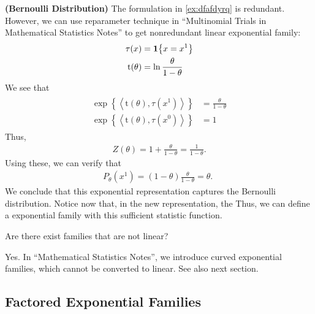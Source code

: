 \documentclass{article}
\newcommand{\bfs}[1]{\textbf{({#1}) }}
\begin{document}
\begin{exma}\bfs{Bernoulli Distribution}
The formulation in \cref{ex:dfafdyrq} is redundant. However, we can use reparameter technique in ``{Multinomial Trials in Mathematical Statistics Notes}'' to get nonredundant linear  exponential family:
\begin{align*}
\begin{aligned}
\tau(x) &=\indicate{x=x^{1}} \\
\mathrm{t}(\theta) &=\ln \frac{\theta}{1-\theta}
\end{aligned}
\end{align*}
We see that
\begin{align*}
\begin{aligned}
\exp \left\{\left\langle\mathrm{t}(\theta), \tau\left(x^{1}\right)\right\rangle\right\} &=\frac{\theta}{1-\theta} \\
\exp \left\{\left\langle\mathrm{t}(\theta), \tau\left(x^{0}\right)\right\rangle\right\} &=1
\end{aligned}
\end{align*}
Thus,
\begin{align*}
Z(\theta)=1+\frac{\theta}{1-\theta}=\frac{1}{1-\theta} .
\end{align*}
Using these, we can verify that
\begin{align*}
P_{\theta}\left(x^{1}\right)=(1-\theta) \frac{\theta}{1-\theta}=\theta \text {. }
\end{align*}
We conclude that this exponential representation captures the Bernoulli distribution. Notice now that, in the new representation, the  Thus, we can define a  exponential family with this sufficient statistic function.
\end{exma}
 Are there exist families that are not linear?

 Yes. In ``Mathematical Statistics Notes'', we introduce curved exponential families, which cannot be converted to linear. See also next section.

\subsection{Factored Exponential Families}
\end{document}
